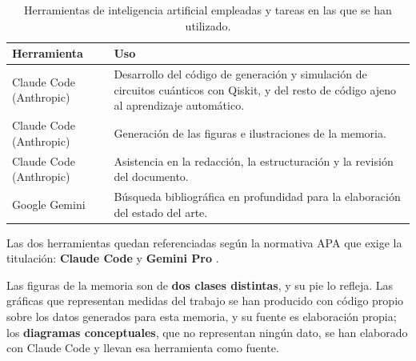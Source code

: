 \begin{table}[htbp]
    \centering
    \begin{tabular}{@{}p{}p{}@{}}
        \toprule
        \textbf{Herramienta} & \textbf{Uso} \\
        \midrule
        Claude Code (Anthropic)
            & Desarrollo del código de generación y simulación de circuitos cuánticos
              con Qiskit, y del resto de código ajeno al aprendizaje automático. \\[0.4em]
        Claude Code (Anthropic)
            & Generación de las figuras e ilustraciones de la memoria. \\[0.4em]
        Claude Code (Anthropic)
            & Asistencia en la redacción, la estructuración y la revisión del documento. \\[0.4em]
        Google Gemini
            & Búsqueda bibliográfica en profundidad para la elaboración del estado del
              arte. \\
        \bottomrule
    \end{tabular}

    \caption{Herramientas de inteligencia artificial empleadas y tareas en las que se han
             utilizado.}
    \label{tab:ia}

\end{table}


Las dos herramientas quedan referenciadas según la normativa APA que exige la titulación:
\textbf{Claude Code} \cite{anthropic_claude} y \textbf{Gemini Pro}
\cite{google_gemini}.

Las figuras de la memoria son de \textbf{dos clases distintas}, y su pie lo refleja. Las
gráficas que representan medidas del trabajo se han producido con código propio sobre los
datos generados para esta memoria, y su fuente es elaboración propia; los \textbf{diagramas
conceptuales}, que no representan ningún dato, se han elaborado con Claude Code y llevan esa
herramienta como fuente.